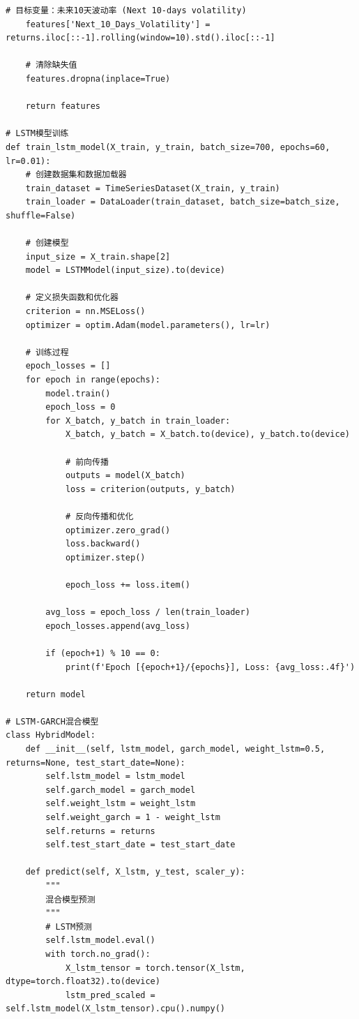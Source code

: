 \documentclass[12pt, a4paper]{article}
\begin{document}
\begin{lstlisting}[basicstyle=\small\ttfamily, breaklines=true, columns=fullflexible]
    # 目标变量：未来10天波动率 (Next 10-days volatility)
    features['Next_10_Days_Volatility'] = returns.iloc[::-1].rolling(window=10).std().iloc[::-1]
    
    # 清除缺失值
    features.dropna(inplace=True)
    
    return features

# LSTM模型训练
def train_lstm_model(X_train, y_train, batch_size=700, epochs=60, lr=0.01):
    # 创建数据集和数据加载器
    train_dataset = TimeSeriesDataset(X_train, y_train)
    train_loader = DataLoader(train_dataset, batch_size=batch_size, shuffle=False)
    
    # 创建模型
    input_size = X_train.shape[2]
    model = LSTMModel(input_size).to(device)
    
    # 定义损失函数和优化器
    criterion = nn.MSELoss()
    optimizer = optim.Adam(model.parameters(), lr=lr)
    
    # 训练过程
    epoch_losses = []
    for epoch in range(epochs):
        model.train()
        epoch_loss = 0
        for X_batch, y_batch in train_loader:
            X_batch, y_batch = X_batch.to(device), y_batch.to(device)
            
            # 前向传播
            outputs = model(X_batch)
            loss = criterion(outputs, y_batch)
            
            # 反向传播和优化
            optimizer.zero_grad()
            loss.backward()
            optimizer.step()
            
            epoch_loss += loss.item()
        
        avg_loss = epoch_loss / len(train_loader)
        epoch_losses.append(avg_loss)
        
        if (epoch+1) % 10 == 0:
            print(f'Epoch [{epoch+1}/{epochs}], Loss: {avg_loss:.4f}')
    
    return model

# LSTM-GARCH混合模型
class HybridModel:
    def __init__(self, lstm_model, garch_model, weight_lstm=0.5, returns=None, test_start_date=None):
        self.lstm_model = lstm_model
        self.garch_model = garch_model
        self.weight_lstm = weight_lstm
        self.weight_garch = 1 - weight_lstm
        self.returns = returns
        self.test_start_date = test_start_date
        
    def predict(self, X_lstm, y_test, scaler_y):
        """
        混合模型预测
        """
        # LSTM预测
        self.lstm_model.eval()
        with torch.no_grad():
            X_lstm_tensor = torch.tensor(X_lstm, dtype=torch.float32).to(device)
            lstm_pred_scaled = self.lstm_model(X_lstm_tensor).cpu().numpy()
        

\end{lstlisting}
\end{document}
